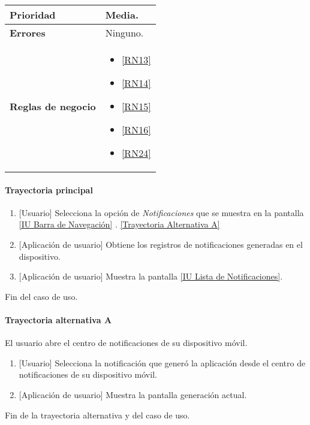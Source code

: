 \begin{longtable}{|J{5cm}|J{10.3cm}|}
		\\ \hline 
	\textbf{Prioridad} & 
		Media. \\ \hline
	\textbf{Errores} & Ninguno. 
		\\ \hline
	\textbf{Reglas de negocio} & 
		\begin{itemize}
		 	\item \ref{RN13}
		 	\item \ref{RN14}
		 	\item \ref{RN15}
		 	\item \ref{RN16}
		 	\item \ref{RN24}
		\end{itemize}
		 \\ \hline
\end{longtable}

\paragraph{Trayectoria principal} \label{SUB-U-CU1.6:TP}
	\begin{enumerate}
		\item {[Usuario]} Selecciona la opción de \textit{Notificaciones} que se muestra en la pantalla  \hyperref[fig:Barra de navegacion]{[IU Barra de Navegación]} . \hyperref[SUB-U-CU1.6:TA]{[Trayectoria Alternativa A]}
		\item {[Aplicación de usuario]} Obtiene los registros de notificaciones generadas en el dispositivo.
		\item {[Aplicación de usuario]} Muestra la pantalla \hyperref[fig:Lista de Notificaciones]{[IU Lista de Notificaciones]}.
	\end{enumerate}
	Fin del caso de uso.

\paragraph{Trayectoria alternativa A} \label{SUB-U-CU1.6:TA}
 	El usuario abre el centro de notificaciones de su dispositivo móvil.
 	\begin{enumerate}[label=A\arabic*.]
 	    \item {[Usuario]} Selecciona la notificación que generó la aplicación desde el centro de notificaciones de su dispositivo móvil.
 	    \item {[Aplicación de usuario]} Muestra la pantalla generación actual.
 	\end{enumerate}
 	Fin de la trayectoria alternativa y del caso de uso.